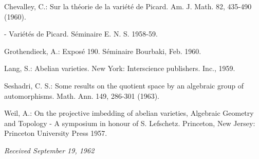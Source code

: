 \begin{thebibliography}{99}
\itemsep=0pt
 Chevalley, C.: Sur la th\'eorie de la vari\'et\'e de Picard. Am. J. Math. 82, 435-490 (1960).

 - Vari\'et\'es de Picard. S\'eminaire E. N. S. 1958-59.

 Grothendieck, A.: Expos\'e 190. S\'eminaire Bourbaki, Feb. 1960.

 Lang, S.: Abelian varieties. New York: Interscience publishers. Inc., 1959. 

 Seshadri, C. S.: Some results on the quotient space by an algebraic group of automorphisms. Math. Ann. 149, 286-301 (1963).

 Weil, A.: On the projective imbedding of abelian varieties, Algebraic Geometry and Topology - A symposium in honour of S. Lefschetz. Princeton, New Jersey: Princeton University Press 1957.
\end{thebibliography}


\begin{center}
{\em Received September 19, 1962}
\end{center}
